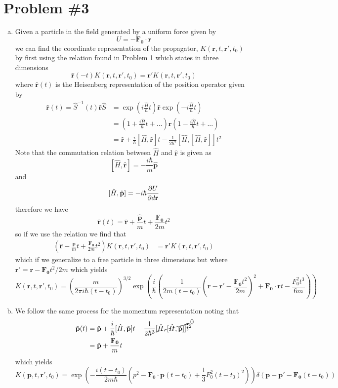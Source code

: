 \documentclass[11pt]{article}
\numberwithin{equation}{section}
\begin{document}
\section{Problem \#3}
\begin{enumerate}[(a)]
\item Given a particle in the field generated by a uniform force given by
$$U = -\mathbf{F_0}\cdot\mathbf{r}$$
we can find the coordinate representation of the propagator, $K(\mathbf{r},t,\mathbf{r'},t_0)$
by first using the relation found in Problem 1 which states in three dimensions
$$\mathbf{\hat{r}}(-t)K(\mathbf{r},t,\mathbf{r'},t_0) = \mathbf{r'}K(\mathbf{r},t,\mathbf{r'},t_0)$$
where $\mathbf{\hat{r}}(t)$ is the Heisenberg representation of the position operator given 
by
\begin{align*}
\mathbf{\hat{r}}(t) = \hat{S}^{-1}(t)\hat{\mathbf{r}}\hat{S} &= \exp\left(i\frac{\hat{H}}{\hbar}t\right)\hat{\mathbf{r}}\exp\left(-i\frac{\hat{H}}{\hbar}t\right)\\
&= \left(1+\frac{i\hat{H}}{\hbar}t+...\right)\hat{\mathbf{r}}\left(1-\frac{i\hat{H}}{\hbar}t+...\right)\\
&= \hat{\mathbf{r}} + \frac{i}{\hbar}[\hat{H},\hat{\mathbf{r}}]t - \frac{1}{2\hbar^2}[\hat{H},[\hat{H},\hat{\mathbf{r}}]]t^2
\end{align*}
Note that the commutation relation between $\hat{H}$ and $\hat{\mathbf{r}}$ is given as
$$[\hat{H},\hat{\mathbf{r}}] = -\frac{i\hbar}{m}\hat{\mathbf{p}}$$
and
$$[\hat{H},\hat{\mathbf{p}}] = -i\hbar\frac{\partial{U}}{\partial{d\mathbf{r}}}$$
therefore we have
$$\mathbf{\hat{r}}(t) = \hat{\mathbf{r}} + \frac{\hat{\mathbf{p}}}{m}t + \frac{\mathbf{F_0}}{2m}t^2$$
so if we use the relation we find that
\begin{align*}
\left(\hat{\mathbf{r}} - \frac{\mathbf{p}}{m}t + \frac{\mathbf{F_0}}{2m}t^2\right)K(\mathbf{r},t,\mathbf{r'},t_0) &= \mathbf{r'}K(\mathbf{r},t,\mathbf{r'},t_0)
\end{align*}
which if we generalize to a free particle in three dimensions but where $\mathbf{r'}= \mathbf{r}-\mathbf{F_0}t^2/2m$
which yields
$$K(\mathbf{r},t,\mathbf{r'},t_0) = \left(\frac{m}{2\pi{i}\hbar(t-t_0)}\right)^{3/2}\exp\left(\frac{i}{\hbar}\left(\frac{1}{2m(t-t_0)}\left(\mathbf{r}-\mathbf{r'}-\frac{\mathbf{F_0}t^2}{2m}\right)^2+\mathbf{F_0}\cdot\mathbf{r}t-\frac{F_0^2t^3}{6m}\right)\right)$$

\item We follow the same process for the momentum representation noting that
\begin{align*}
\hat{\mathbf{p}}(t) &= \hat{\mathbf{p}} + \frac{i}{\hbar}[\hat{H},\hat{\mathbf{p}}]t - \frac{1}{2\hbar^2}\cancelto{0}{[\hat{H},[\hat{H},\hat{\mathbf{p}}]]}t^2\\
 &= \hat{\mathbf{p}} + \frac{\mathbf{F_0}}{m}t 
\end{align*}
which yields
$$K(\mathbf{p},t,\mathbf{r'},t_0) = \exp\left(-\frac{i(t-t_0)}{2m\hbar}\left(p^2-\mathbf{F_0}\cdot\mathbf{p}(t-t_0)+\frac{1}{3}F_0^2(t-t_0)^2\right)\right)\delta(\mathbf{p}-\mathbf{p'}-\mathbf{F_0}(t-t_0))$$



\end{enumerate}
\end{document}
